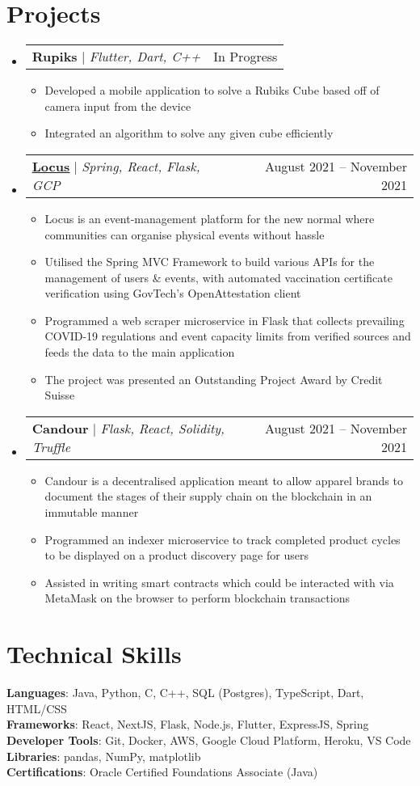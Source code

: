 \documentclass[letterpaper,11pt]{article}
\makeatletter
\newcommand{\resumeItem}[1]{
  \item\small{
    {#1 \vspace{-2pt}}
  }
}
\newcommand{\resumeProjectHeading}[2]{
    \item
    \begin{tabular*}{0.97\textwidth}{l@{\extracolsep{\fill}}r}
      \small#1 & #2 \\
    \end{tabular*}\vspace{-7pt}
}
\newcommand{\resumeSubHeadingListStart}{\begin{itemize}[leftmargin=0.15in, label={}]}
\newcommand{\resumeSubHeadingListEnd}{\end{itemize}}
\newcommand{\resumeItemListStart}{\begin{itemize}}
\newcommand{\resumeItemListEnd}{\end{itemize}\vspace{-5pt}}
\makeatother
\begin{document}
\section{Projects}
    \resumeSubHeadingListStart
      \resumeProjectHeading
          {\textbf{Rupiks} $|$ \emph{Flutter, Dart, C++}}{In Progress}
          \resumeItemListStart
            \resumeItem{Developed a mobile application to solve a Rubiks Cube based off of camera input from the device}
            \resumeItem{Integrated an algorithm to solve any given cube efficiently}
          \resumeItemListEnd
      \resumeProjectHeading
          {\textbf{\href{https://github.com/omerwyo/Locus}{\underline{Locus}}} $|$ \emph{Spring, React, Flask, GCP}}{August 2021 -- November 2021}
          \resumeItemListStart
            \resumeItem{Locus is an event-management platform for the new normal where communities can organise physical events without hassle}
            \resumeItem{Utilised the Spring MVC Framework to build various APIs for the management of users \& events, with automated vaccination certificate verification using GovTech's OpenAttestation client}
            \resumeItem{Programmed a web scraper microservice in Flask that collects prevailing COVID-19 regulations and event capacity limits from verified sources and feeds the data to the main application}
            \resumeItem{The project was presented an Outstanding Project Award by Credit Suisse}
          \resumeItemListEnd
      \resumeProjectHeading
          {\textbf{Candour} $|$ \emph{Flask, React, Solidity, Truffle}}{August 2021 -- November 2021}
          \resumeItemListStart
            \resumeItem{Candour is a decentralised application meant to allow apparel brands to document the stages of their supply chain on the blockchain in an immutable manner}
            \resumeItem{Programmed an indexer microservice to track completed product cycles to be displayed on a product discovery page for users}
            \resumeItem{Assisted in writing smart contracts which could be interacted with via MetaMask on the browser to perform blockchain transactions}
          \resumeItemListEnd
    \resumeSubHeadingListEnd

%
\section{Technical Skills}
 \begin{itemize}[leftmargin=0.15in, label={}]
    \small{\item{
     \textbf{Languages}{: Java, Python, C, C++, SQL (Postgres), TypeScript, Dart, HTML/CSS} \\
     \textbf{Frameworks}{: React, NextJS, Flask, Node.js, Flutter, ExpressJS, Spring} \\
     \textbf{Developer Tools}{: Git, Docker, AWS, Google Cloud Platform, Heroku, VS Code } \\
     \textbf{Libraries}{: pandas, NumPy, matplotlib} \\
     \textbf{Certifications}{: Oracle Certified Foundations Associate (Java)}
    }}
 \end{itemize}


\end{document}
